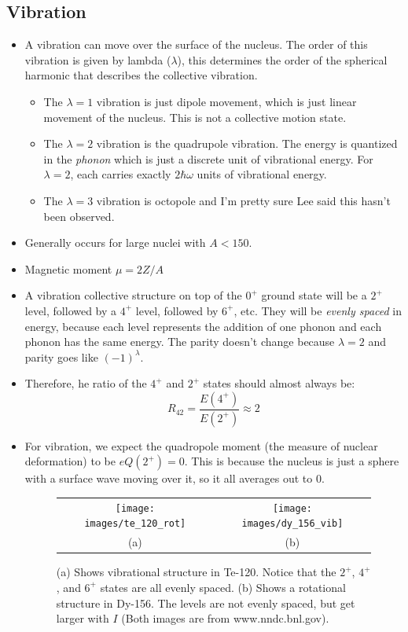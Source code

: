\documentclass[letter]{article}
\begin{document}
\subsection{Vibration}
\begin{itemize}
\item A vibration can move over the surface of the nucleus. The order
  of this vibration is given by lambda ($\lambda$), this determines
  the order of the spherical harmonic that describes the collective vibration.
  \begin{itemize}
  \item The $\lambda=1$ vibration is just dipole movement, which
    is just linear movement of the nucleus. This is not a collective
    motion state.
  \item The $\lambda=2$ vibration is the quadrupole vibration. The
    energy is quantized in the \textit{phonon} which is just a
    discrete unit of vibrational energy. For $\lambda=2$, each carries
    exactly $2\hbar\omega$ units of vibrational energy.
  \item The $\lambda=3$ vibration is octopole and I'm pretty sure Lee
    said this hasn't been observed.
  \end{itemize}
\cite[Lec 13-16]{lecture}
\item Generally occurs for large nuclei with $A < 150$.~\cite[pp. 142]{krane}
\item Magnetic moment $\mu = 2Z/A$
\item A vibration collective structure on top of the $0^+$ ground
  state will be a $2^+$ level, followed by a $4^+$ level, followed by
  $6^+$, etc.  They will be
  \textit{evenly spaced} in energy, because each level represents the
  addition of one phonon and each phonon has the same energy. The
  parity doesn't change because $\lambda=2$ and parity goes like
  $(-1)^\lambda$.~\cite[Lec 13-16]{lecture}
\item Therefore, he ratio of the $4^+$ and $2^+$ states should almost always be:
  \begin{equation*}
    R_{42}=\frac{E(4^+)}{E(2^+)} \approx 2
  \end{equation*}
\item For vibration, we expect the quadropole moment (the measure of
  nuclear deformation) to be $eQ(2^+)=0$. This is because the nucleus
  is just a sphere with a surface wave moving over it, so it all
  averages out to 0.~\cite[Lec 13-16]{lecture}
  \begin{figure}[hbt]
    \centering
    \begin{tabular}{cc}
    \texttt{[image: images/te\_120\_rot]} &
    \texttt{[image: images/dy\_156\_vib]} \\
      \small{(a)} & \small{(b)}
    \end{tabular}
    \caption{(a) Shows vibrational structure in Te-120. Notice that the $2^+$,
      $4^+$, and $6^+$ states are all evenly spaced. (b) Shows a
      rotational structure in Dy-156. The levels are not evenly
      spaced, but get larger with $I$ (Both images are from www.nndc.bnl.gov).}
    \label{fig:te120}
  \end{figure}

\end{itemize}
\end{document}
